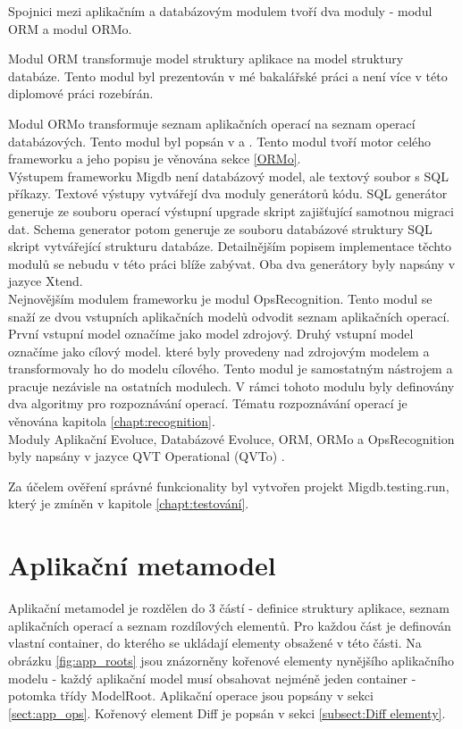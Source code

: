 \documentclass[11pt,twoside,a4paper]{book}
\begin{document}
Spojnici mezi aplikačním a databázovým modulem tvoří dva moduly - modul ORM a
modul ORMo.
 
Modul ORM transformuje model struktury aplikace na model struktury databáze.
Tento modul byl prezentován v mé bakalářské práci \cite{Lukes} a není více v
této diplomové práci rozebírán.
 
Modul ORMo transformuje seznam aplikačních operací na seznam operací
databázových. Tento modul byl popsán v \cite{Jezek} a \cite{Tarant_bp}. Tento
modul tvoří motor celého frameworku a jeho popisu je věnována sekce \ref{ORMo}.\\
 
Výstupem frameworku Migdb není databázový model, ale textový soubor s SQL
příkazy. Textové výstupy vytvářejí dva moduly generátorů kódu. SQL generátor
generuje ze souboru operací výstupní upgrade skript zajišťující samotnou migraci
dat. Schema generator potom generuje ze souboru databázové struktury SQL skript
vytvářející strukturu databáze. Detailnějším popisem implementace těchto modulů
se nebudu v této práci blíže zabývat. Oba dva generátory byly napsány v jazyce
Xtend.\\

Nejnovějším modulem frameworku je modul OpsRecognition. Tento modul se
snaží ze dvou vstupních aplikačních modelů odvodit seznam aplikačních operací.
První vstupní model označíme jako model zdrojový. Druhý vstupní model označíme
jako cílový model. které byly provedeny nad zdrojovým modelem a transformovaly
ho do modelu cílového. Tento modul je samostatným nástrojem a pracuje
nezávisle na ostatních modulech. V rámci tohoto modulu byly definovány dva
algoritmy pro rozpoznávání operací. Tématu rozpoznávání operací je věnována
kapitola \ref{chapt:recognition}.
\\

Moduly Aplikační Evoluce, Databázové Evoluce, ORM, ORMo a OpsRecognition byly
napsány v jazyce QVT Operational (QVTo) \cite{QVTo}.

Za účelem ověření správné funkcionality byl vytvořen projekt Migdb.testing.run,
který je zmíněn v kapitole \ref{chapt:testování}.
%
\section{Aplikační metamodel}
Aplikační metamodel je rozdělen do 3 částí - definice struktury aplikace,
seznam aplikačních operací a seznam rozdílových elementů. Pro každou část je
definován vlastní container, do kterého se ukládají elementy obsažené v této
části. Na obrázku \ref{fig:app_roots} jsou znázorněny kořenové elementy
nynějšího aplikačního modelu - každý aplikační model musí obsahovat nejméně
jeden container - potomka třídy ModelRoot. Aplikační operace jsou popsány v
sekci \ref{sect:app_ops}. Kořenový element Diff je popsán v sekci
\ref{subsect:Diff elementy}.
\end{document}
